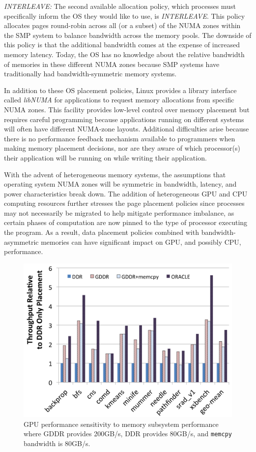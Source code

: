 \emph{INTERLEAVE:} The second available allocation policy, which processes must
specifically inform the OS they would like to use, is \emph{INTERLEAVE}\@. This
policy allocates pages round-robin across all (or a subset) of the NUMA zones
within the SMP system to balance bandwidth across the memory pools.  The
downside of this policy is that the additional bandwidth comes at the expense of
increased memory latency. Today, the OS has no knowledge about the relative
bandwidth of memories in these different NUMA zones because SMP systems have
traditionally had bandwidth-symmetric memory systems.

In addition to these OS placement policies, Linux provides a library interface
called \textit{libNUMA} for applications to request memory allocations from
specific NUMA zones.  This facility provides low-level control over memory
placement but requires careful programming because applications running on
different systems will often have different NUMA-zone layouts.  Additional
difficulties arise because there is no performance feedback mechanism available
to programmers when making memory placement decisions, nor are they aware of
which processor(s) their application will be running on while writing their
application.

With the advent of heterogeneous memory systems, the assumptions that operating
system NUMA zones will be symmetric in bandwidth, latency, and power
characteristics break down.  The addition of heterogeneous GPU and CPU computing
resources further stresses the page placement policies since processes may not
necessarily be migrated to help mitigate performance imbalance, as certain
phases of computation are now pinned to the type of processor executing the
program.  As a result, data placement policies combined with
bandwidth-asymmetric memories can have significant impact on GPU, and possibly
CPU, performance.

\begin{figure}[t]
        \includegraphics[width=\columnwidth]{hpca2015/figures/motivation.png}
    \caption{GPU performance sensitivity to memory subsystem performance where GDDR provides 
    200GB/s, DDR provides 80GB/s, and {\tt memcpy} bandwidth is 80GB/s.}
    \label{fig:motivation}
\end{figure}


